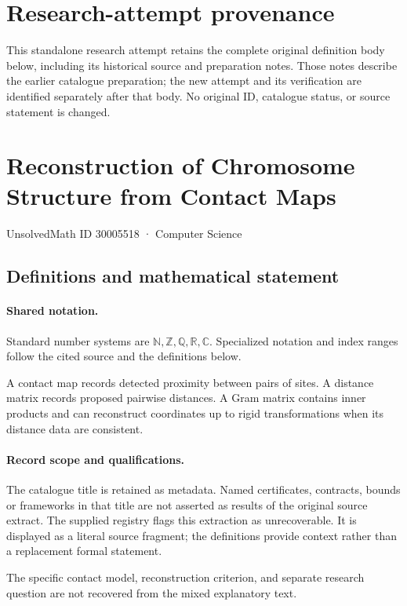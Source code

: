 \documentclass[11pt]{article}
\begin{document}
\section*{Research-attempt provenance}
This standalone research attempt retains the complete original definition body below,
including its historical source and preparation notes. Those notes describe the
earlier catalogue preparation; the new attempt and its verification are identified
separately after that body. No original ID, catalogue status, or source statement is changed.

\section{Reconstruction of Chromosome Structure from Contact Maps}\label{30005518}
{\small UnsolvedMath ID 30005518 · Computer Science}
\subsection{Definitions and mathematical statement}

\paragraph{Shared notation.}Standard number systems are $\mathbb N,\mathbb Z,\mathbb Q,\mathbb R,\mathbb C$. Specialized notation and index ranges follow the cited source and the definitions below.


A contact map records detected proximity between pairs of sites. A distance matrix records proposed pairwise distances. A Gram matrix contains inner products and can reconstruct coordinates up to rigid transformations when its distance data are consistent.
\paragraph{Record scope and qualifications.}
The catalogue title is retained as metadata. Named certificates, contracts, bounds or frameworks in that title are not asserted as results of the original source extract.
The supplied registry flags this extraction as unrecoverable. It is displayed as a literal source fragment; the definitions provide context rather than a replacement formal statement.

The specific contact model, reconstruction criterion, and separate research question are not recovered from the mixed explanatory text.
\end{document}
